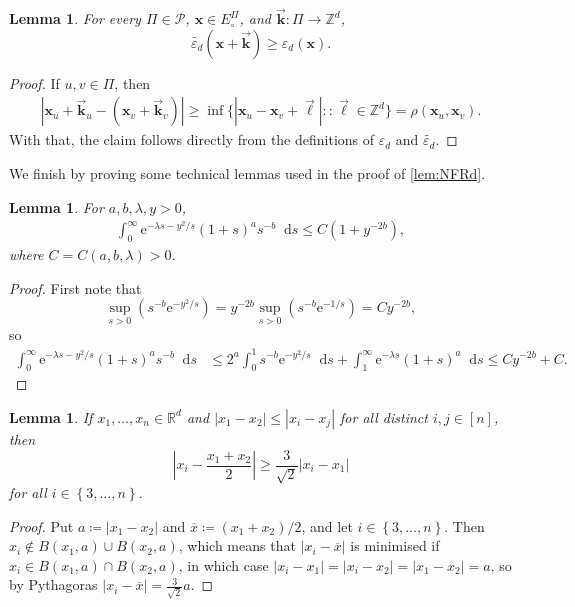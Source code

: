 \documentclass[reqno,draft]{amsart}
\numberwithin{equation}{section}
\theoremstyle{plain}
\newtheorem{lemma}[theorem]{Lemma}
\theoremstyle{remark}
\newcommand{\R}{\mathbb{R}} %
\newcommand{\Z}{\mathbb{Z}} %
\newcommand*\diff{\mathop{}\!\mathrm{d}}
\newcommand{\e}{\mathrm{e}}
\newcommand{\fpart}{\Pi} %
\newcommand{\rfy}[1]{\widetilde{{#1}}} %
\begin{document}
\begin{lemma}
    For every $\fpart\in \mathcal{P}$, $\boldsymbol x\in E^\fpart_\circ $, and $\vec{\boldsymbol k}\colon \fpart \to \Z^d$, \[
        \rfy{\varepsilon_d}(\boldsymbol x +  \vec{\boldsymbol k}) \ge \varepsilon_d(\boldsymbol x).
    \]
\end{lemma}
\begin{proof}
    If $u,v\in \fpart$, then
    \begin{align*}
        | \boldsymbol x_u +  \vec{\boldsymbol k}_u - (\boldsymbol x_v +  \vec{\boldsymbol k}_v)| \ge \inf \{|\boldsymbol x_u - \boldsymbol x_v +  \vec{\ell}| \colon :\vec{\ell}\in \Z^d\} = \rho(\boldsymbol x_u,\boldsymbol x_v).
    \end{align*}
    With that, the claim follows directly from the definitions of $\varepsilon_d$ and $\rfy{\varepsilon_d}$.
\end{proof}

We finish by proving some technical lemmas used in the proof of \cref{lem:NFRd}.

\begin{lemma}\label{lem:NFaux:1}
    For $a,b,\lambda,y> 0$,
    \begin{align*}
        \int_0^\infty \e^{-\lambda s - y^2 / s} (1+s)^a s^{-b}\diff s \le C \left( 1 + y^{-2b} \right) ,
    \end{align*}
    where $C = C(a,b,\lambda) > 0$.
\end{lemma}
\begin{proof}
    First note that \[
        \sup_{s > 0}\left( s^{-b} \e^{-y^2 / s}\right) = y^{-2b} \sup_{s > 0}\left( s^{-b} \e^{-1 / s} \right) = C y^{-2b},
    \] so
    \begin{align*}
        \int_0^\infty \e^{-\lambda s - y^2 / s} (1+s)^a s^{-b} \diff s
        &\le 2^a \int_0^1 s^{-b}\e^{-y^2 / s} \diff s + \int_1^\infty \e^{-\lambda s} (1+s)^a \diff s \le C y^{-2b} + C.
    \end{align*}
\end{proof}

\begin{lemma}\label{lem:NFaux:2}
    If $x_1, \ldots ,x_n\in \R^d$ and $|x_1-x_2| \le |x_i-x_j|$ for all distinct $i,j\in [n]$, then \[
        |x_i - \frac{x_1+x_2}{2}| \ge \frac{3}{\sqrt{2} } |x_i - x_1|
    \] for all $i\in \left\{ 3, \ldots ,n \right\} $.
\end{lemma}
\begin{proof}
    Put $a \coloneqq |x_1-x_2|$ and $\overline{x} \coloneqq (x_1+x_2) / 2$, and let $i\in \left\{ 3, \ldots ,n \right\} $. Then $x_i \not\in B(x_1,a) \cup B(x_2,a)$, which means that $|x_i - \overline{x}|$ is minimised if $x_i \in B(x_1,a) \cap B(x_2,a)$, in which case $|x_i - x_1| = |x_i - x_2| = |x_1-x_2| = a$, so by Pythagoras $|x_i - \overline{x}| = \frac{3}{\sqrt{2} } a$.
\end{proof}
\end{document}
